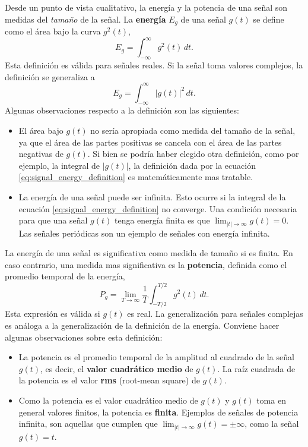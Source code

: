 \documentclass[a4paper]{article}
\begin{document}
Desde un punto de vista cualitativo, la energía y la potencia de una señal son medidas del \emph{tamaño} de la señal.
La \textbf{energía} \(E_g\) de una señal \(g(t)\) se define como el área bajo la curva \(g^2(t)\),
\begin{equation}\label{eq:signal_energy_definition}
 E_g = \int_{-\infty}^{\infty}g^2(t)\,dt. 
\end{equation}
Esta definición es válida para señales reales. Si la señal toma valores complejos, la definición se generaliza a
\[
 E_g = \int_{-\infty}^{\infty}|g(t)|^2\,dt.
\]
Algunas observaciones respecto a la definición son las siguientes:
\begin{itemize}
 \item El área bajo \(g(t)\) no sería apropiada como medida del tamaño de la señal, ya que el área de las partes positivas se cancela con el área de las partes negativas de \(g(t)\). Si bien se podría haber elegido otra definición, como por ejemplo, la integral de \(|g(t)|\), la definición dada por la ecuación \ref{eq:signal_energy_definition} es matemáticamente mas tratable. 
 \item La energía de una señal puede ser infinita. Esto ocurre si la integral de la ecuación \ref{eq:signal_energy_definition} no converge.  Una condición necesaria para que una señal \(g(t)\) tenga energía finita es que \(\lim_{|t|\to\infty}g(t)=0\). Las señales periódicas son un ejemplo de señales con energía infinita.
\end{itemize}

La energía de una señal es significativa como medida de tamaño si es finita. En caso contrario, una medida mas significativa es la \textbf{potencia}, definida como el promedio temporal de la energía,
\begin{equation}\label{eq:signal_power_definition}
 P_g =  \lim_{T\to\infty}\frac{1}{T}\int_{-T/2}^{T/2}g^2(t)\,dt.
\end{equation}
Esta expresión es válida si \(g(t)\) es real. La generalización para señales complejas es análoga a la generalización de la definición de la energía. Conviene hacer algunas observaciones sobre esta definición:
\begin{itemize}
 \item La potencia es el promedio temporal de la amplitud al cuadrado de la señal \(g(t)\), es decir, el \textbf{valor cuadrático medio} de \(g(t)\). La raíz cuadrada de la potencia es el valor \textbf{rms} (root-mean square) de \(g(t)\).
 \item Como la potencia es el valor cuadrático medio de \(g(t)\) y \(g(t)\) toma en general valores finitos, la potencia es \textbf{finita}. Ejemplos de señales de potencia infinita, son aquellas que cumplen que \(\lim_{|t|\to\infty}g(t)=\pm\infty\), como la señal \(g(t)=t\).
\end{itemize}
\end{document}
